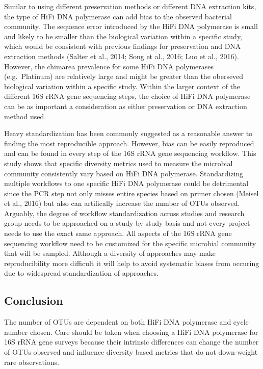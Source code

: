 \documentclass[12pt,]{article}
\begin{document}
Similar to using different preservation methods or different DNA
extraction kits, the type of HiFi DNA polymerase can add bias to the
observed bacterial community. The sequence error introduced by the HiFi
DNA polymerase is small and likely to be smaller than the biological
variation within a specific study, which would be consistent with
previous findings for preservation and DNA extraction methods (Salter et
al., 2014; Song et al., 2016; Luo et al., 2016). However, the chimarea
prevalence for some HiFi DNA polymerases (e.g.~Platinum) are relatively
large and might be greater than the oberseved biological variation
within a specific study. Within the larger context of the different 16S
rRNA gene sequencing steps, the choice of HiFi DNA polymerase can be as
important a consideration as either preservation or DNA extraction
method used.

Heavy standardization has been commonly suggested as a reasonable answer
to finding the most reproducible approach. However, bias can be easily
reproduced and can be found in every step of the 16S rRNA gene
sequencing workflow. This study shows that specific diversity metrics
used to measure the microbial community consistently vary based on HiFi
DNA polymerase. Standardizing multiple workflows to one specific HiFi
DNA polymerase could be detrimental since the PCR step not only misses
entire species based on primer chosen (Meisel et al., 2016) but also can
artifically increase the number of OTUs observed. Arguably, the degree
of workflow standardization across studies and research group needs to
be approached on a study by study basis and not every project needs to
use the exact same approach. All aspects of the 16S rRNA gene sequencing
workflow need to be customized for the specific microbial community that
will be sampled. Although a diversity of approaches may make
reproducibility more difficult it will help to avoid systematic biases
from occuring due to widespread standardization of approaches.

\newpage

\subsection{Conclusion}\label{conclusion}

The number of OTUs are dependent on both HiFi DNA polymerase and cycle
number chosen. Care should be taken when choosing a HiFi DNA polymerase
for 16S rRNA gene surveys because their intrinsic differences can change
the number of OTUs observed and influence diversity based metrics that
do not down-weight rare observations.
\end{document}
